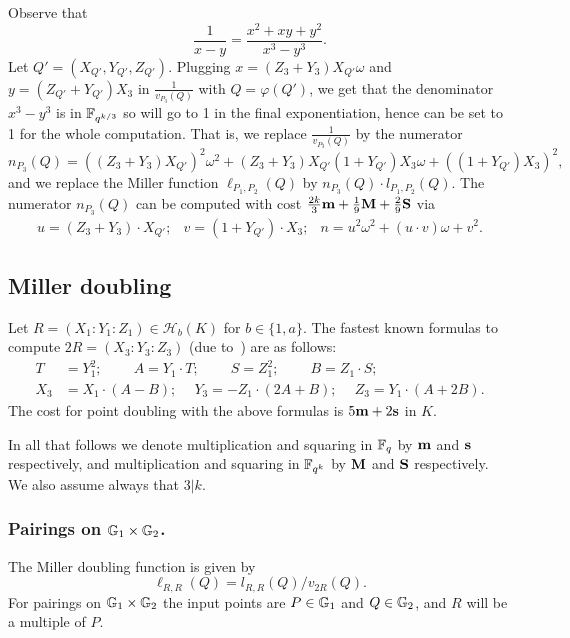 Observe that
\[\frac{1}{x-y} = \frac{x^2 + xy + y^2}{x^3-y^3}.\]
Let $Q' = (X_{Q'},Y_{Q'},Z_{Q'})$.
Plugging $x = (Z_3 + Y_3)X_{Q'}\omega$ and $y = (Z_{Q'}+Y_{Q'})X_3$ in $\frac{1}{v_{P_3}(Q)}$ with $Q = \varphi(Q')$,
we get that the denominator $x^3 - y^3$ is in $\mathbb{F}_{q^{k/3}}$ so will go to 1 in the final exponentiation, hence can be set to 1 for the whole computation.
That is, we replace $\frac{1}{v_{P_3}(Q)}$ by the numerator 
$$n_{P_3}(Q) = ((Z_3 + Y_3)X_{Q'})^2\omega^2 
+ (Z_3 + Y_3)X_{Q'}(1+Y_{Q'})X_3\omega 
+ ((1+Y_{Q'})X_3)^2,$$
and we replace the Miller function 
$\ell_{P_1,P_2}(Q)$ by $n_{P_3}(Q) \cdot l_{P_1,P_2}(Q)$.
The numerator $n_{P_3}(Q)$ can be computed with cost
$\frac{2k}{3}\textbf{m} + \frac{1}{9}\textbf{M} + \frac{2}{9}\textbf{S}$ via
\[\begin{array}{cccc}
u = (Z_3 + Y_3)\cdot X_{Q'}; &
v = (1+Y_{Q'}) \cdot X_3; &
n = u^2\omega^2 + (u\cdot v)\omega + v^2.
\end{array}\]

\subsection{Miller doubling}

Let $R = (X_1 : Y_1 : Z_1) \in \mathcal{H}_b(K)$ for $b \in \{1,a\}$.
The fastest known formulas to compute $2R = (X_3 : Y_3 : Z_3)$
(due to~\cite{2015/hessian}) are as follows:
\begin{align*}
T &= Y_1^2;\	\qquad	A = Y_1 \cdot T;\	\qquad
S = Z_1 ^ 2;\	\qquad	B = Z_1 \cdot S;\\
X_3 &= X_1 \cdot (A - B);\	\quad
Y_3 = -Z_1 \cdot (2A + B);\	\quad
Z_3 = Y_1 \cdot (A + 2B).
\end{align*}
The cost for point doubling with the above formulas is
$5\textbf{m} + 2\textbf{s}$ in $K$.

In all that follows we denote multiplication and squaring in $\mathbb{F}_{q}$ by $\textbf{m}$ and $\textbf{s}$ respectively, and multiplication and squaring in $\mathbb{F}_{q^k}$ by $\textbf{M}$ and $\textbf{S}$ respectively. We also assume always that $3|k$.

\subsubsection{Pairings on $\mathbb{G}_{1} \times \mathbb{G}_{2}$.}

The Miller doubling function is given by
$$\ell_{R,R}(Q) = l_{R,R}(Q)/v_{2R}(Q).$$
For pairings on $\mathbb{G}_{1} \times \mathbb{G}_{2}$ the input points are
$P \in \mathbb{G}_{1}$ and $Q \in \mathbb{G}_{2}$, and
$R$ will be a multiple of $P$.

